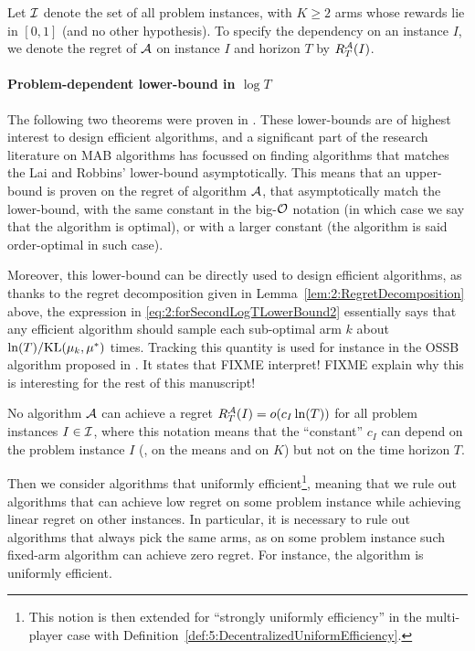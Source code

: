 Let $\mathcal{I}$ denote the set of all problem instances, with $K \geq 2$ arms whose rewards lie in $[0,1]$ (and no other hypothesis).
To specify the dependency on an instance $I$, we denote the regret of $\mathcal{A}$ on instance $I$ and horizon $T$ by $R_T^{\mathcal{A}}(I)$.


\paragraph{Problem-dependent lower-bound in $\log T$}

The following two theorems were proven in \cite{LaiRobbins85}.
These lower-bounds are of highest interest to design efficient algorithms,
and a significant part of the research literature on MAB algorithms has focussed on finding algorithms that matches the Lai and Robbins' lower-bound asymptotically.
This means that an upper-bound is proven on the regret of algorithm $\mathcal{A}$, that asymptotically match the lower-bound, with the same constant in the big-$\mathcal{O}$ notation (in which case we say that the algorithm is optimal), or with a larger constant (the algorithm is said order-optimal in such case).

Moreover, this lower-bound can be directly used to design efficient algorithms, as thanks to the regret decomposition given in Lemma~\ref{lem:2:RegretDecomposition} above, the expression in \eqref{eq:2:forSecondLogTLowerBound2} essentially says that any efficient algorithm
should sample each sub-optimal arm $k$ about $\ln(T)/\mathrm{KL}(\mu_k,\mu^*)$ times.
Tracking this quantity is used for instance in the OSSB algorithm proposed in \cite{Combes17}.
It states that FIXME interpret!
FIXME explain why this is interesting for the rest of this manuscript!

\begin{theorem}\label{thm:2:firstLogTLowerBound}
    No algorithm $\mathcal{A}$ can achieve a regret $R_T^{\mathcal{A}}(I) = \mathop{}\mathopen{}o\mathopen{}\left(c_I \ln(T)\right)$ for all problem instances $I \in \mathcal{I}$,
    where this notation means that the ``constant'' $c_I$ can depend on the problem instance $I$ (\eg, on the means and on $K$) but not on the time horizon $T$.
\end{theorem}

Then we consider algorithms that uniformly efficient\footnote{This notion is then extended for ``strongly uniformly efficiency'' in the multi-player case with Definition~\ref{def:5:DecentralizedUniformEfficiency}.}, meaning that we rule out algorithms that can achieve low regret on some problem instance while achieving linear regret on other instances.
In particular, it is necessary to rule out algorithms that always pick the same arms, as on some problem instance such fixed-arm algorithm can achieve zero regret.
For instance, the \UCB{} algorithm is uniformly efficient.

